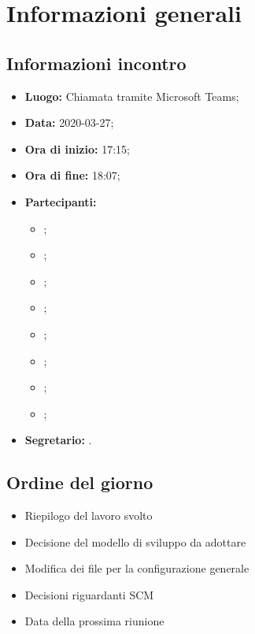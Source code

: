 \section{Informazioni generali}
\subsection{Informazioni incontro}
\begin{itemize}
	\item \textbf{Luogo:} Chiamata tramite Microsoft Teams; 
	\item \textbf{Data:} 2020-03-27;
	\item \textbf{Ora di inizio:} 17:15; 
	\item \textbf{Ora di fine:} 18:07; 
	\item \textbf{Partecipanti:}
		\begin{itemize}
			\item \VB; 
			\item \LB; 
			\item \NF; 
			\item \EG; 
			\item \FJ; 
			\item \MP; 
			\item \AS; 
			\item \AZ; 
		\end{itemize}
	\item \textbf{Segretario:} \NF. 
\end{itemize}

\subsection{Ordine del giorno}
\begin{itemize}
	\item Riepilogo del lavoro svolto
	\item Decisione del modello di sviluppo da adottare
	\item Modifica dei file per la configurazione generale
	\item Decisioni riguardanti SCM
	\item Data della prossima riunione
\end{itemize}
